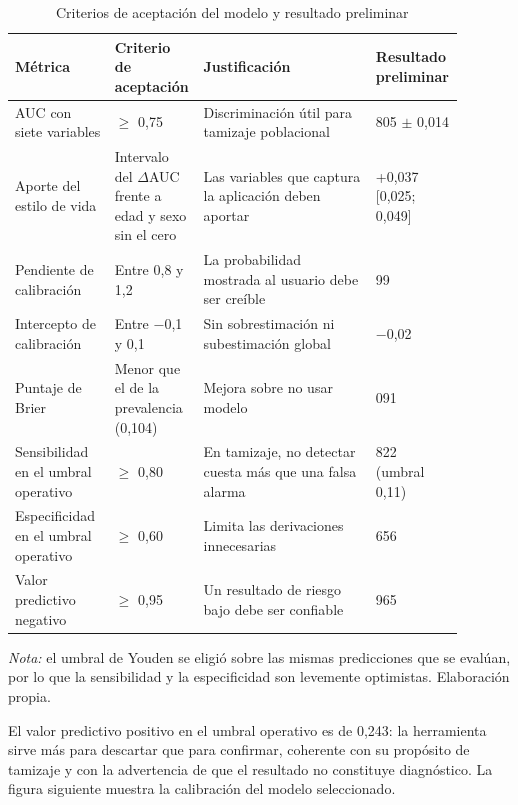 \documentclass[conference]{IEEEtran}
\begin{document}
\begin{table}[!t]
\centering
\caption{Criterios de aceptación del modelo y resultado preliminar}
\footnotesize
\renewcommand{\arraystretch}{1.15}
\begin{tabular}{>{\raggedright\arraybackslash}p{0.222\linewidth}>{\raggedright\arraybackslash}p{0.168\linewidth}>{\raggedright\arraybackslash}p{0.388\linewidth}>{\raggedright\arraybackslash}p{0.110\linewidth}}
\hline
\textbf{Métrica} & \textbf{Criterio de aceptación} & \textbf{Justificación} & \textbf{Resultado preliminar} \\ \hline
AUC con siete variables & $\geq$ 0{,}75 & Discriminación útil para tamizaje poblacional & 0{,}805 $\pm$ 0{,}014 \\ \hline
Aporte del estilo de vida & Intervalo del $\Delta$AUC frente a edad y sexo sin el cero & Las variables que captura la aplicación deben aportar & +0{,}037 [0{,}025; 0{,}049] \\ \hline
Pendiente de calibración & Entre 0{,}8 y 1{,}2 & La probabilidad mostrada al usuario debe ser creíble & 0{,}99 \\ \hline
Intercepto de calibración & Entre $-$0{,}1 y 0{,}1 & Sin sobrestimación ni subestimación global & $-$0{,}02 \\ \hline
Puntaje de Brier & Menor que el de la prevalencia (0{,}104) & Mejora sobre no usar modelo & 0{,}091 \\ \hline
Sensibilidad en el umbral operativo & $\geq$ 0{,}80 & En tamizaje, no detectar cuesta más que una falsa alarma & 0{,}822 (umbral 0{,}11) \\ \hline
Especificidad en el umbral operativo & $\geq$ 0{,}60 & Limita las derivaciones innecesarias & 0{,}656 \\ \hline
Valor predictivo negativo & $\geq$ 0{,}95 & Un resultado de riesgo bajo debe ser confiable & 0{,}965 \\ \hline
\end{tabular}
\par\smallskip\parbox{\linewidth}{\scriptsize\textit{Nota:} el umbral de Youden se eligió sobre las mismas predicciones que se evalúan, por lo que la sensibilidad y la especificidad son levemente optimistas. Elaboración propia.}
\end{table}
El valor predictivo positivo en el umbral operativo es de 0{,}243: la herramienta sirve más para descartar que para confirmar, coherente con su propósito de tamizaje y con la advertencia de que el resultado no constituye diagnóstico. La figura siguiente muestra la calibración del modelo seleccionado.
\end{document}
